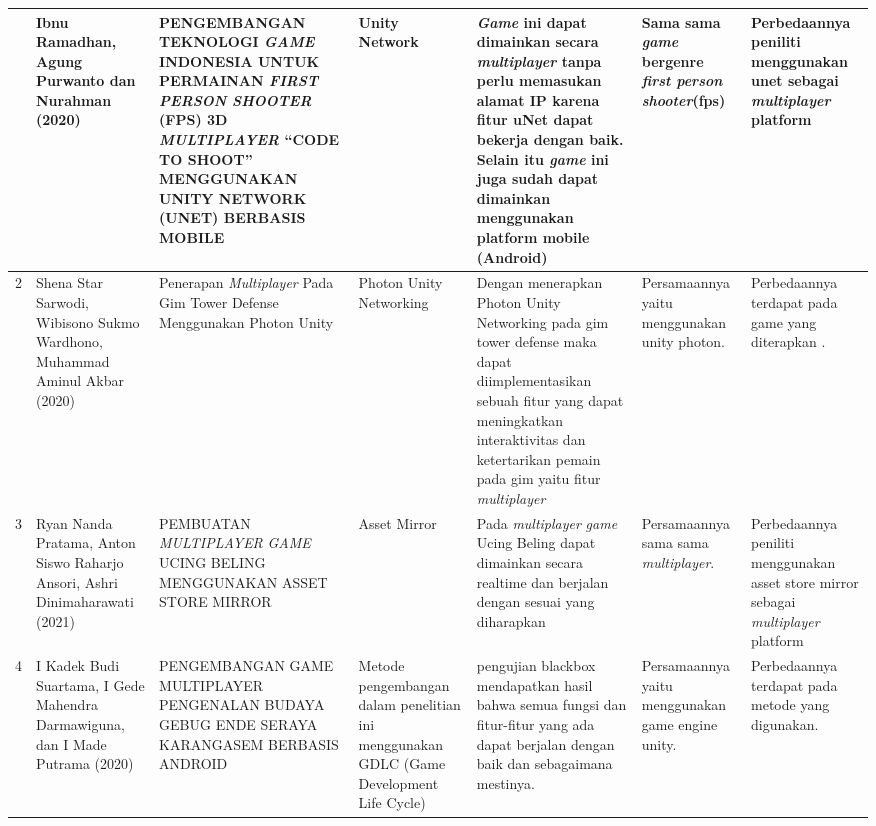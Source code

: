 \begin{landscape}
\begin{center}
\begin{longtable}{| c | L{3cm} | L{4cm} | L{2.5cm} | L{4cm} | L{3cm} | L{3cm} |}
	\hline \hline
	 	& Ibnu Ramadhan, Agung Purwanto dan Nurahman (2020) \cite{fps}
	& PENGEMBANGAN TEKNOLOGI \textit{GAME} INDONESIA UNTUK PERMAINAN \textit{FIRST PERSON SHOOTER} (FPS) 3D \textit{MULTIPLAYER} “CODE TO SHOOT” MENGGUNAKAN UNITY NETWORK (UNET) BERBASIS MOBILE
	& Unity Network
	& \textit{Game} ini dapat dimainkan secara \textit{multiplayer} tanpa perlu memasukan alamat IP karena fitur uNet dapat bekerja dengan baik. Selain itu \textit{game} ini juga sudah dapat dimainkan menggunakan platform mobile (Android)
	& Sama sama \textit{game} bergenre \textit{first person shooter}(fps)
	& Perbedaannya peniliti menggunakan unet sebagai \textit{multiplayer} platform
	\\  	& Shena Star Sarwodi, Wibisono Sukmo Wardhono, Muhammad Aminul Akbar (2020) \cite{Sarwodi}
	& Penerapan \textit{Multiplayer} Pada Gim Tower Defense Menggunakan Photon Unity
	& Photon Unity Networking
	& Dengan menerapkan Photon Unity Networking pada gim tower defense maka dapat diimplementasikan sebuah fitur yang dapat meningkatkan interaktivitas dan ketertarikan pemain pada gim yaitu fitur \textit{multiplayer}
	&Persamaannya yaitu menggunakan unity photon.
	&Perbedaannya terdapat pada game yang diterapkan .
	\\ \hline

	3 	& Ryan Nanda Pratama,  Anton Siswo Raharjo Ansori, Ashri Dinimaharawati (2021) \cite{Ansori}
		& PEMBUATAN \textit{MULTIPLAYER} \textit{GAME} UCING BELING MENGGUNAKAN ASSET STORE MIRROR
		& Asset Mirror
		& Pada \textit{multiplayer} \textit{game} Ucing Beling dapat dimainkan secara realtime dan berjalan dengan sesuai yang diharapkan
		& Persamaannya sama sama \textit{multiplayer}.
		& Perbedaannya peniliti menggunakan asset store mirror sebagai \textit{multiplayer} platform
		\\ \hline	
	
		4 	& I Kadek Budi Suartama, I Gede Mahendra Darmawiguna, dan I Made Putrama (2020) \cite{Gebug}
		& PENGEMBANGAN GAME MULTIPLAYER PENGENALAN BUDAYA GEBUG ENDE SERAYA KARANGASEM BERBASIS ANDROID
		 & Metode pengembangan dalam penelitian ini menggunakan GDLC (Game Development Life Cycle)
		 & pengujian blackbox mendapatkan hasil bahwa semua fungsi dan fitur-fitur yang ada dapat 
		 berjalan dengan baik dan sebagaimana mestinya.
		 & Persamaannya yaitu menggunakan game engine unity.
		 & Perbedaannya terdapat pada metode yang digunakan.
		 \\ \hline

	
	

\end{longtable}
\end{center}
\end{landscape}
